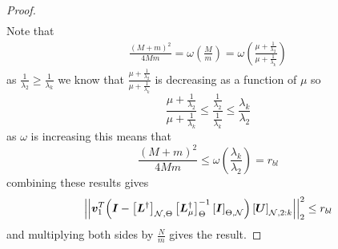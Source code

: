 \begin{proof}
\begin{align}
\end{align}
Note that 
\begin{align}
    \frac{(M+m)^{2}}{4Mm} = \omega\left(\frac{M}{m}\right) = \omega\left(\frac{\mu + \frac{1}{\lambda_{2}}}{\mu + \frac{1}{\lambda_{k}}}\right)
\end{align}
as $\frac{1}{\lambda_{2}} \geq \frac{1}{\lambda_{k}}$ we know that $\frac{\mu + \frac{1}{\lambda_{2}}}{\mu + \frac{1}{\lambda_{k}}}$ is decreasing as a function of $\mu$ so
\begin{equation}
    \frac{\mu + \frac{1}{\lambda_{2}}}{\mu + \frac{1}{\lambda_{k}}} \leq \frac{ \frac{1}{\lambda_{2}}}{ \frac{1}{\lambda_{k}}} \leq \frac{\lambda_{k}}{\lambda_{2}}
\end{equation}
as $\omega$ is increasing this means that
\begin{equation}
    \frac{(M+m)^{2}}{4Mm} \leq \omega\left(\frac{\lambda_{k}}{\lambda_{2}}\right) = r_{bl}
\end{equation}
combining these results gives
\begin{equation}
    \sqnormvec{\vect{v}_{1}^{T}{\left( \matr{I} - \msubgen[\set{N},\Theta]{\matr{L}^{\dagger}} \msubgen[\Theta]{ \matr{L}_{\mu}^{\dagger}}^{-1}\msubgen[\Theta,\set{N}]{\matr{I}}\right)\msubgen[\set{N},2:k]{\matr{U}}}} \leq r_{bl}
\end{equation}
and multiplying both sides by $\frac{N}{m}$ gives the result.
\end{proof}

